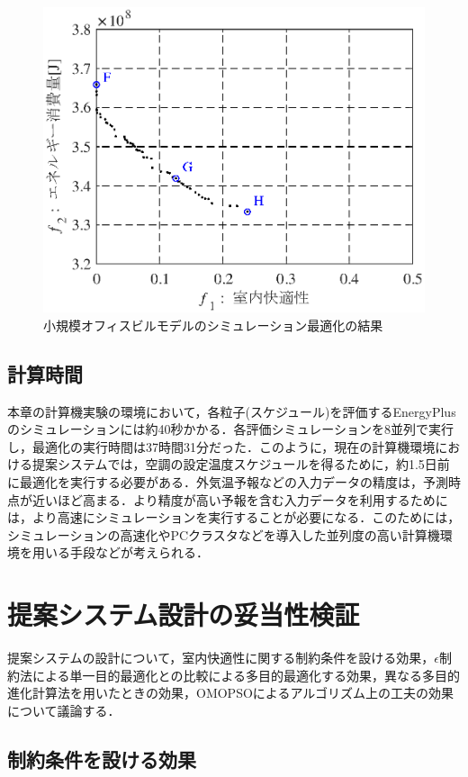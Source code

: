 \begin{figure}[htbp]
  \begin{center}
    \includegraphics[width=0.7\linewidth]{fig/sim_result_pareto_small.eps}
  \end{center}
  \caption{小規模オフィスビルモデルのシミュレーション最適化の結果}
  \label{fig::sim_result_pareto_small}
\end{figure}

\subsection{計算時間}
本章の計算機実験の環境において，各粒子(スケジュール)を評価するEnergyPlusのシミュレーションには約40秒かかる．各評価シミュレーションを8並列で実行し，最適化の実行時間は37時間31分だった．このように，現在の計算機環境における提案システムでは，空調の設定温度スケジュールを得るために，約1.5日前に最適化を実行する必要がある．外気温予報などの入力データの精度は，予測時点が近いほど高まる．より精度が高い予報を含む入力データを利用するためには，より高速にシミュレーションを実行することが必要になる．このためには，シミュレーションの高速化やPCクラスタなどを導入した並列度の高い計算機環境を用いる手段などが考えられる．

\section{提案システム設計の妥当性検証}\label{sec::sim_valid}
提案システムの設計について，室内快適性に関する制約条件を設ける効果，$\epsilon$制約法による単一目的最適化との比較による多目的最適化する効果，異なる多目的進化計算法を用いたときの効果，OMOPSOによるアルゴリズム上の工夫の効果について議論する．

\subsection{制約条件を設ける効果}
